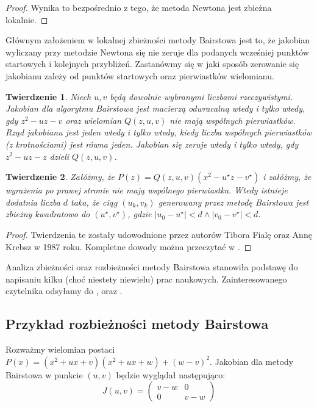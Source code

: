\documentclass{article}
\newtheorem{thm}{Twierdzenie}
\begin{document}
\begin{proof}
Wynika to bezpośrednio z tego, że metoda Newtona jest zbieżna lokalnie.	
\end{proof}

Głównym założeniem w lokalnej zbieżności metody Bairstowa jest to, że jakobian wyliczany przy metodzie Newtona się nie zeruje dla podanych wcześniej punktów startowych i kolejnych przybliżeń. Zastanówmy się w jaki sposób zerowanie się jakobianu zależy od punktów startowych oraz pierwiastków wielomianu.

\begin{thm}
Niech $u, v$ będą dowolnie wybranymi liczbami rzeczywistymi. Jakobian dla algorytmu Bairstowa jest macierzą odwracalną wtedy i tylko wtedy, gdy $z^2 - uz - v$ oraz wielomian $Q(z,u,v)$ nie mają wspólnych pierwiastków. Rząd jakobianu jest jeden wtedy i tylko wtedy, kiedy liczba wspólnych pierwiastków (z krotnościami) jest równa jeden. Jakobian się zeruje wtedy i tylko wtedy, gdy $z^2 - uz - z$ dzieli $Q(z,u,v)$.
\end{thm}

\begin{thm}
Załóżmy, że $P(z) = Q(z, u, v) (x^2 - u^{\star} z - v^{\star})$ i załóżmy, że wyrażenia po prawej stronie nie mają wspólnego pierwiastka. Wtedy istnieje dodatnia liczba $d$ taka, że ciąg $(u_k, v_k)$ generowany przez metodę Bairstowa jest zbieżny kwadratowo do $(u^{\star}, v^{\star})$, gdzie $|u_0 - u^{\star}| < d \wedge |v_0 - v^{\star}| < d$. 
\end{thm}

\begin{proof}
Twierdzenia te zostały udowodnione przez autorów Tibora Fialę oraz Annę Krebsz w 1987 roku. Kompletne dowody można przeczytać w \cite{krebsz}.
\end{proof}

Analiza zbieżności oraz rozbieżności metody Bairstowa stanowiła podstawę do napisaniu kilku (choć niestety niewielu) prac naukowych. Zainteresowanego czytelnika odsyłamy do \cite{krebsz}, \cite{Gabler} oraz \cite{Glasson}. 

\subsection{Przykład rozbieżności metody Bairstowa}

Rozważmy wielomian postaci $P(x) = (x^2 + ux + v)(x^2 + ux + w) + (w-v)^2.$
Jakobian dla metody Bairstowa w punkcie $(u,v)$ będzie wyglądał następująco:
$$
J(u,v) = \begin{pmatrix}
v-w & 0\\ 
0 & v-w 
\end{pmatrix}
$$
\end{document}
